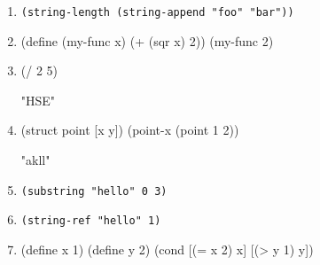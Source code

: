 \documentclass[11pt]{article}
\newcommand{\prog}[1]{\texttt{#1}}
\begin{document}
\begin{enumerate}[label=(\alph*)]
\item \prog{(string-length (string-append "foo" "bar"))}

\else
 \vspace{12mm}
\fi


\item
\begin{program}
  (define (my-func x) (+ (sqr x) 2))
  (my-func 2)
\end{program}
\else
 \vspace{12mm}
\fi

\item 

\begin{program}
 (/ 2 5)
\end{program}

\sol
\begin{program}
"HSE"
\end{program}
\else
 \vspace{12mm}
\fi

\item

\begin{program}
  (struct point [x y])  
  (point-x (point 1 2))
\end{program}

\sol
\begin{program}
"akll"
\end{program}
\else
 \vspace{12mm}
\fi


\item \prog{(substring "hello" 0 3)}

\sol
\begin{program}
\end{program}
\else
 \vspace{12mm}
\fi

\item \prog{(string-ref "hello" 1)}

\sol
\begin{program}
\end{program}
\else
 \vspace{12mm}
\fi

\item
  \begin{program}
    (define x 1)
    (define y 2)
    (cond
      [(= x 2) x]
      [(> y 1) y])
  \end{program}


\end{enumerate}
\end{document}

